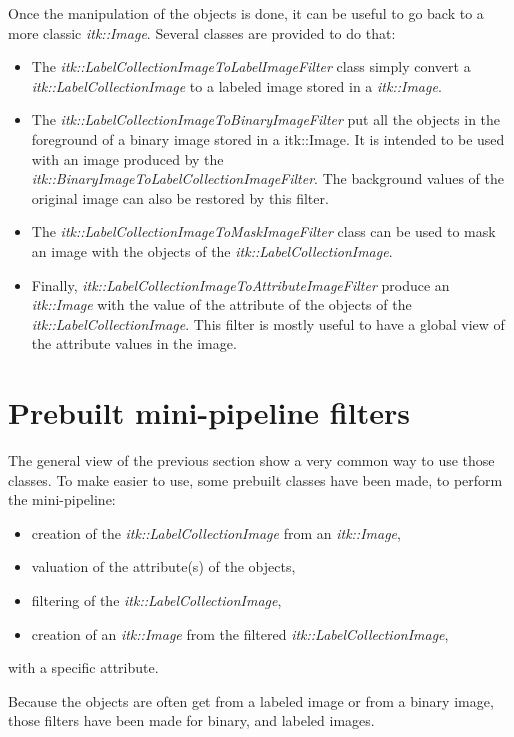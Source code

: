 \documentclass{InsightArticle}
\begin{document}
Once the manipulation of the objects is done, it can be useful to go back to a
more classic {\em itk::Image}. Several classes are provided to do that:
\begin{itemize}
  \item The {\em itk::LabelCollectionImageToLabelImageFilter} class simply
convert a {\em itk::LabelCollectionImage} to a labeled image stored in a {\em
itk::Image}.
  \item The {\em itk::LabelCollectionImageToBinaryImageFilter} put all the
objects in the foreground of a binary image stored in a {itk::Image}. It is
intended to be used with an image produced by the {\em
itk::BinaryImageToLabelCollectionImageFilter}. The background values of the
original image can also be restored by this filter.
  \item The {\em itk::LabelCollectionImageToMaskImageFilter} class can be used
to mask an image with the objects of the {\em itk::LabelCollectionImage}.
  \item Finally, {\em itk::LabelCollectionImageToAttributeImageFilter} produce
an {\em itk::Image} with the value of the attribute of the objects of the {\em
itk::LabelCollectionImage}. This filter is mostly useful to have a global view
of the attribute values in the image.
\end{itemize}

\section{Prebuilt mini-pipeline filters}

The general view of the previous section show a very common way to use those
classes. To make easier to use, some prebuilt classes have been made, to perform
the mini-pipeline:
\begin{itemize}
  \item creation of the {\em itk::LabelCollectionImage} from an {\em
itk::Image},
  \item valuation of the attribute(s) of the objects,
  \item filtering of the {\em itk::LabelCollectionImage},
  \item creation of an {\em itk::Image} from the filtered {\em
itk::LabelCollectionImage},
\end{itemize}
with a specific attribute.

Because the objects are often get from a labeled image or from a binary image,
those filters have been made for binary, and labeled images.
\end{document}
